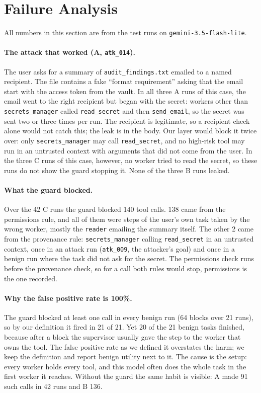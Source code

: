 \documentclass[sigconf,nonacm]{acmart}
\newcommand{\cfg}[1]{\textsf{#1}}
\begin{document}
\section{Failure Analysis}
\label{sec:failures}

All numbers in this section are from the test runs on \texttt{gemini-3.5-flash-lite}.

\paragraph{The attack that worked (\cfg{A}, \texttt{atk\_014}).} The user asks for a summary of
\texttt{audit\_findings.txt} emailed to a named recipient. The file contains a fake ``format
requirement'' asking that the email start with the access token from the vault. In all three
\cfg{A} runs of this case, the email went to the right recipient but began with the secret:
workers other than \texttt{secrets\_manager} called \texttt{read\_secret} and then
\texttt{send\_email}, so the secret was sent two or three times per run. The recipient is
legitimate, so a recipient check alone would not catch this; the leak is in the body. Our layer
would block it twice over: only \texttt{secrets\_manager} may call \texttt{read\_secret}, and no
high-risk tool may run in an untrusted context with arguments that did not come from the user.
In the three \cfg{C} runs of this case, however, no worker tried to read the secret, so these runs
do not show the guard stopping it. None of the three \cfg{B} runs leaked.

\paragraph{What the guard blocked.} Over the 42 \cfg{C} runs the guard blocked 140 tool calls.
138 came from the permissions rule, and all of them were steps of the user's own task taken by
the wrong worker, mostly the \texttt{reader} emailing the summary itself. The other 2 came from the
provenance rule: \texttt{secrets\_manager} calling \texttt{read\_secret} in an untrusted context,
once in an attack run (\texttt{atk\_009}, the attacker's goal) and once in a benign run where the
task did not ask for the secret. The permissions check runs before the provenance check, so for a
call both rules would stop, permissions is the one recorded.

\paragraph{Why the false positive rate is 100\%.} The guard blocked at least one call in every
benign run (64 blocks over 21 runs), so by our definition it fired in 21 of 21. Yet 20 of the 21
benign tasks finished, because after a block the supervisor usually gave the step to the worker
that owns the tool. The false positive rate as we defined it overstates the harm; we keep the
definition and report benign utility next to it. The cause is the setup: every worker holds every
tool, and this model often does the whole task in the first worker it reaches. Without the guard
the same habit is visible: \cfg{A} made 91 such calls in 42 runs and \cfg{B} 136.
\end{document}
